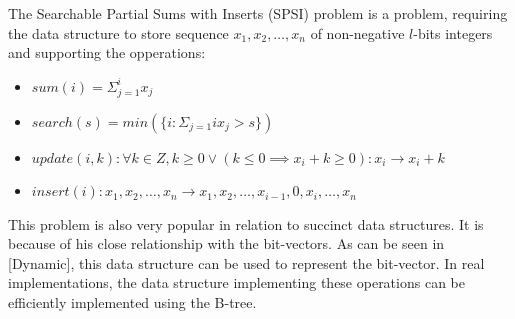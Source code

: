 \begin{theorem}
The Searchable Partial Sums with Inserts (SPSI) problem is a problem, requiring the data structure to
store sequence $x_1, x_2, \ldots , x_n$ of non-negative $l$-bits integers and supporting the opperations:
\begin{itemize}
    \item $sum(i) = \Sigma_{j=1}^{i} x_j$
    \item $search(s) = min(\{i : \Sigma_{j=1}{i} x_j > s \})$
    \item $update(i, k): \forall k \in Z, k \geq 0 \lor (k\leq 0 \implies x_i + k \geq 0): x_i \rightarrow x_i + k$
    \item $insert(i): x_1, x_2,\ldots, x_n \rightarrow x_1, x_2,\ldots , x_{i-1}, 0, x_{i}, \ldots , x_n$
\end{itemize}
\end{theorem}

This problem is also very popular in relation to succinct data structures. It is because of his close relationship with the bit-vectors.
As can be seen in [Dynamic], this data structure can be used to represent the bit-vector. In real implementations, the data structure
implementing these operations can be efficiently implemented using the B-tree.
